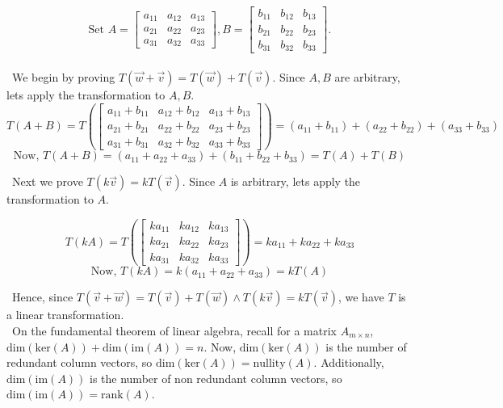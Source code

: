 \documentclass[12pt]{article}
\begin{document}
$$\text{Set }A=\begin{bmatrix}a_{11} & a_{12} & a_{13}\\a_{21} & a_{22} & a_{23}\\a_{31} & a_{32} & a_{33}\end{bmatrix}, B=\begin{bmatrix}b_{11} & b_{12} & b_{13}\\b_{21} & b_{22} & b_{23}\\b_{31} & b_{32} & b_{33}\end{bmatrix}.$$\\

$\,\,\,$We begin by proving $T(\vec{w}+\vec{v})=T(\vec{w})+T(\vec{v})$. Since $A,B$ are arbitrary, lets apply the transformation to $A,B$.
$$T(A+B)=T\left(\begin{bmatrix}a_{11}+b_{11} & a_{12}+b_{12} & a_{13}+b_{13}\\a_{21}+b_{21} & a_{22}+b_{22} & a_{23}+b_{23}\\a_{31}+b_{31} & a_{32}+b_{32} & a_{33}+b_{33}\end{bmatrix}\right)=(a_{11}+b_{11})+(a_{22}+b_{22})+(a_{33}+b_{33})$$
$$\text{Now, }T(A+B)=(a_{11}+a_{22}+a_{33})+(b_{11}+b_{22}+b_{33})=T(A)+T(B)$$

$\,\,\,$Next we prove $T(k\vec{v})=kT(\vec{v})$. Since $A$ is arbitrary, lets apply the transformation to $A$.

$$T(kA)=T\left(\begin{bmatrix}ka_{11} & ka_{12} & ka_{13}\\ka_{21} & ka_{22} & ka_{23}\\ka_{31} & ka_{32} & ka_{33}\end{bmatrix}\right)=ka_{11}+ka_{22}+ka_{33}$$
$$\text{Now, }T(kA)=k(a_{11}+a_{22}+a_{33})=kT(A)$$

$\,\,\,$Hence, since $T(\vec{v}+\vec{w})=T(\vec{v})+T(\vec{w})\land T(k\vec{v})=kT(\vec{v})$, we have $T$ is a linear transformation.\\

$\,\,\,$On the fundamental theorem of linear algebra, recall for a matrix $A_{m\times n}$, $\text{dim}(\text{ker}(A))+\text{dim}(\text{im}(A))=n$. Now, $\text{dim}(\text{ker}(A))$ is the number of redundant column vectors, so $\text{dim}(\text{ker}(A))=\text{nullity}(A)$. Additionally, $\text{dim}(\text{im}(A))$ is the number of non redundant column vectors, so $\text{dim}(\text{im}(A))=\text{rank}(A)$.
\end{document}
